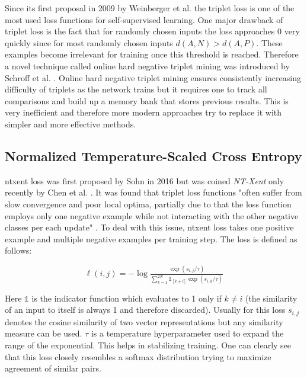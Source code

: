 Since its first proposal in 2009 by Weinberger et al. \cite{Weinberger09distancemetric} the triplet loss is one of the most used loss functions for self-supervised learning. One major drawback of triplet loss is the fact that for randomly chosen inputs the loss approaches 0 very quickly since for most randomly chosen inputs $d(A,N) > d(A,P)$. These examples become irrelevant for training once this threshold is reached. Therefore a novel technique called online hard negative triplet mining was introduced by Schroff et al. \cite{Schroff_2015}. Online hard negative triplet mining ensures consistently increasing difficulty of triplets as the network trains but it requires one to track all comparisons and build up a memory bank that stores previous results. This is very inefficient and therefore more modern approaches try to replace it with simpler and more effective methods.

\subsection{Normalized Temperature-Scaled Cross Entropy}\label{subsec:ntxent}

\gls{ntxent} loss was first proposed by Sohn in 2016 \cite{sohn2016improved} but was coined \textit{NT-Xent} only recently by Chen et al. \cite{chen2020simple}. It was found that triplet loss functions "often suffer from slow convergence and poor local optima, partially due to that the loss function employs only one negative example while not interacting with the other negative classes per each update" \cite{sohn2016improved}. To deal with this issue, \gls{ntxent} loss takes one positive example and multiple negative examples per training step. The loss is defined as follows:

\begin{equation}
   \ell(i,j) = -\log \tfrac{\exp(s_{i,j}/\tau)}{\sum_{k=1}^{2N} \mathbb{1}_{[k \neq i]} \exp(s_{i,k} / \tau)}
   \label{eq:ntxent_loss}
\end{equation}

Here $\mathbb{1}$ is the indicator function which evaluates to 1 only if $k \neq i$ (the similarity of an input to itself is always 1 and therefore discarded). Usually for this loss $s_{i,j}$ denotes the cosine similarity of two vector representations but any similarity measure can be used. $\tau$ is a temperature hyperparameter used to expand the range of the exponential. This helps in stabilizing training. One can clearly see that this loss closely resembles a softmax distribution trying to maximize agreement of similar pairs.

